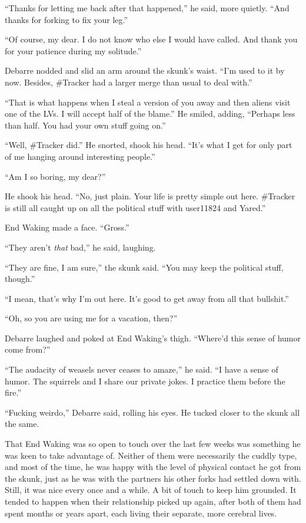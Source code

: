 ``Thanks for letting me back after that happened,'' he said, more quietly. ``And thanks for forking to fix your leg.''

``Of course, my dear. I do not know who else I would have called. And thank you for your patience during my solitude.''

Debarre nodded and slid an arm around the skunk's waist. ``I'm used to it by now. Besides, \#Tracker had a larger merge than usual to deal with.''

``That is what happens when I steal a version of you away and then aliens visit one of the LVs. I will accept half of the blame.'' He smiled, adding, ``Perhaps less than half. You had your own stuff going on.''

``Well, \#Tracker did.'' He snorted, shook his head. ``It's what I get for only part of me hanging around interesting people.''

``Am I so boring, my dear?''

He shook his head. ``No, just plain. Your life is pretty simple out here. \#Tracker is still all caught up on all the political stuff with user11824 and Yared.''

End Waking made a face. ``Gross.''

``They aren't \emph{that} bad,'' he said, laughing.

``They are fine, I am sure,'' the skunk said. ``You may keep the political stuff, though.''

``I mean, that's why I'm out here. It's good to get away from all that bullshit.''

``Oh, so you are using me for a vacation, then?''

Debarre laughed and poked at End Waking's thigh. ``Where'd this sense of humor come from?''

``The audacity of weasels never ceases to amaze,'' he said. ``I have a sense of humor. The squirrels and I share our private jokes. I practice them before the fire.''

``Fucking weirdo,'' Debarre said, rolling his eyes. He tucked closer to the skunk all the same.

That End Waking was so open to touch over the last few weeks was something he was keen to take advantage of. Neither of them were necessarily the cuddly type, and most of the time, he was happy with the level of physical contact he got from the skunk, just as he was with the partners his other forks had settled down with. Still, it was nice every once and a while. A bit of touch to keep him grounded. It tended to happen when their relationship picked up again, after both of them had spent months or years apart, each living their separate, more cerebral lives.

